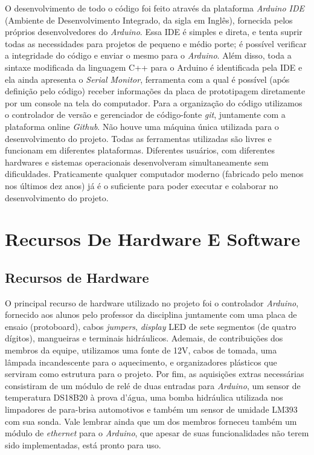 \documentclass[a4paper,12pt]{article}
\begin{document}
O desenvolvimento de todo o código foi feito através da plataforma \textit{Arduino IDE} (Ambiente de Desenvolvimento Integrado, da sigla em Inglês), fornecida pelos próprios desenvolvedores do \textit{Arduino}. Essa IDE é simples e direta, e tenta suprir todas as necessidades para projetos de pequeno e médio porte; é possível verificar a integridade do código e enviar o mesmo para o \textit{Arduino}. Além disso, toda a sintaxe modificada da linguagem C++ para o Arduino é identificada pela IDE e ela ainda apresenta o \textit{Serial Monitor}, ferramenta com a qual é possível (após definição pelo código) receber informações da placa de prototipagem diretamente por um console na tela do computador. Para a organização do código utilizamos o controlador de versão e gerenciador de código-fonte \textit{git}, juntamente com a plataforma online \textit{Github}. Não houve uma máquina única utilizada para o desenvolvimento do projeto. Todas as ferramentas utilizadas são livres e funcionam em diferentes plataformas. Diferentes usuários, com diferentes hardwares e sistemas operacionais desenvolveram simultaneamente sem dificuldades. Praticamente qualquer computador moderno (fabricado pelo menos nos últimos dez anos) já é o suficiente para poder executar e colaborar no desenvolvimento do projeto.


\newpage
\section{Recursos De Hardware E Software}
\subsection{Recursos de Hardware}

O principal recurso de hardware utilizado no projeto foi o controlador \textit{Arduino}, fornecido aos alunos pelo professor da disciplina juntamente com uma placa de ensaio (protoboard), cabos \textit{jumpers}, \textit{display} LED de sete segmentos (de quatro dígitos), mangueiras e terminais hidráulicos. Ademais, de contribuições dos membros da equipe, utilizamos uma fonte de 12V, cabos de tomada, uma lâmpada incandescente para o aquecimento,  e organizadores plásticos que serviram como estrutura para o projeto. Por fim, as aquisições extras necessárias consistiram de um módulo de relé de duas entradas para \textit{Arduino}, um sensor de temperatura DS18B20 à prova d’água, uma bomba hidráulica utilizada nos limpadores de para-brisa automotivos e também um sensor de umidade LM393 com sua sonda. Vale lembrar ainda que um dos membros forneceu também um módulo de \textit{ethernet} para o \textit{Arduino}, que apesar de suas funcionalidades não terem sido implementadas, está pronto para uso.\cite{igoe2007making}
\end{document}
